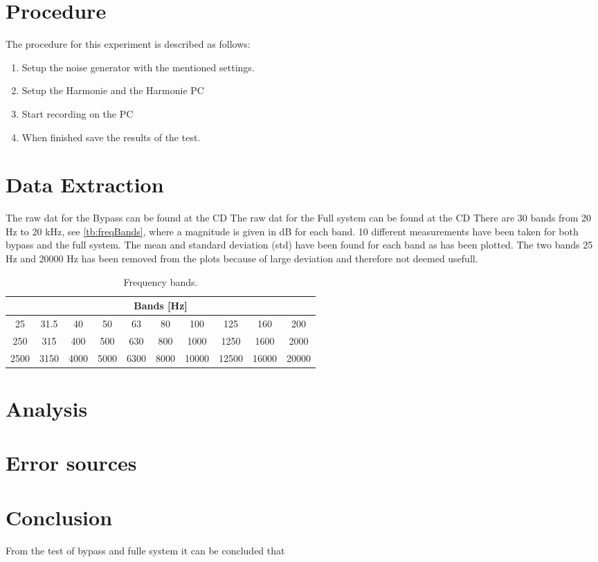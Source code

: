 \section{Procedure}
The procedure for this experiment is described as follows:
\vspace{-5mm}
\begin{enumerate}
\item Setup the noise generator with the mentioned settings.
\item Setup the Harmonie and the Harmonie PC
\item Start recording on the PC
\item When finished save the results of the test.
\end{enumerate}

\section{Data Extraction}
The raw dat for the Bypass can be found at the CD 
The raw dat for the Full system can be found at the CD 
There are 30 bands from 20 Hz to 20 kHz, see \autoref{tb:freqBands}, where a magnitude is given in dB for each band. 10 different measurements have been taken for both bypass and the full system. The mean and standard deviation (std) have been found for each band as has been plotted. The two bands 25 Hz and 20000 Hz has been removed from the plots because of large deviation and therefore not deemed usefull.

\begin{table}[H]
\centering
\begin{tabular}{|c|c|c|c|c|c|c|c|c|c|}
\hline
\multicolumn{10}{|c|}{Bands [Hz]}                                       \\ \hline
25   & 31.5 & 40   & 50   & 63   & 80   & 100   & 125   & 160   & 200   \\ \hline
250  & 315  & 400  & 500  & 630  & 800  & 1000  & 1250  & 1600  & 2000  \\ \hline
2500 & 3150 & 4000 & 5000 & 6300 & 8000 & 10000 & 12500 & 16000 & 20000 \\ \hline
\end{tabular}
\caption{Frequency bands.}
\label{tb:freqBands}
\end{table}

\section{Analysis}


\section{Error sources}


\section{Conclusion}
From the test of bypass and fulle system it can be concluded that 